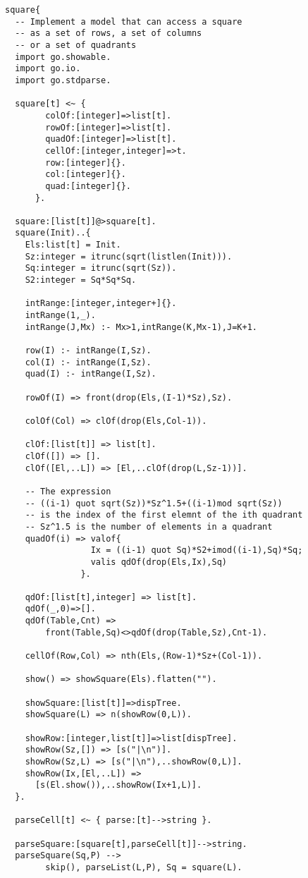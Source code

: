 \begin{verbatim}
square{
  -- Implement a model that can access a square
  -- as a set of rows, a set of columns 
  -- or a set of quadrants
  import go.showable.
  import go.io.
  import go.stdparse.

  square[t] <~ { 
        colOf:[integer]=>list[t]. 
        rowOf:[integer]=>list[t].
        quadOf:[integer]=>list[t].
        cellOf:[integer,integer]=>t.
        row:[integer]{}.
        col:[integer]{}.
        quad:[integer]{}.
      }.

  square:[list[t]]@>square[t].
  square(Init)..{
    Els:list[t] = Init.
    Sz:integer = itrunc(sqrt(listlen(Init))).
    Sq:integer = itrunc(sqrt(Sz)).
    S2:integer = Sq*Sq*Sq.

    intRange:[integer,integer+]{}.
    intRange(1,_).
    intRange(J,Mx) :- Mx>1,intRange(K,Mx-1),J=K+1.

    row(I) :- intRange(I,Sz).
    col(I) :- intRange(I,Sz).
    quad(I) :- intRange(I,Sz).

    rowOf(I) => front(drop(Els,(I-1)*Sz),Sz).

    colOf(Col) => clOf(drop(Els,Col-1)).

    clOf:[list[t]] => list[t].
    clOf([]) => [].
    clOf([El,..L]) => [El,..clOf(drop(L,Sz-1))].

    -- The expression
    -- ((i-1) quot sqrt(Sz))*Sz^1.5+((i-1)mod sqrt(Sz))
    -- is the index of the first elemnt of the ith quadrant
    -- Sz^1.5 is the number of elements in a quadrant
    quadOf(i) => valof{
                 Ix = ((i-1) quot Sq)*S2+imod((i-1),Sq)*Sq;
                 valis qdOf(drop(Els,Ix),Sq)
               }.

    qdOf:[list[t],integer] => list[t].
    qdOf(_,0)=>[].
    qdOf(Table,Cnt) => 
        front(Table,Sq)<>qdOf(drop(Table,Sz),Cnt-1).
    
    cellOf(Row,Col) => nth(Els,(Row-1)*Sz+(Col-1)).

    show() => showSquare(Els).flatten("").

    showSquare:[list[t]]=>dispTree.
    showSquare(L) => n(showRow(0,L)).

    showRow:[integer,list[t]]=>list[dispTree].
    showRow(Sz,[]) => [s("|\n")].
    showRow(Sz,L) => [s("|\n"),..showRow(0,L)].
    showRow(Ix,[El,..L]) => 
      [s(El.show()),..showRow(Ix+1,L)].
  }.

  parseCell[t] <~ { parse:[t]-->string }.

  parseSquare:[square[t],parseCell[t]]-->string.
  parseSquare(Sq,P) --> 
        skip(), parseList(L,P), Sq = square(L).


\end{verbatim}
